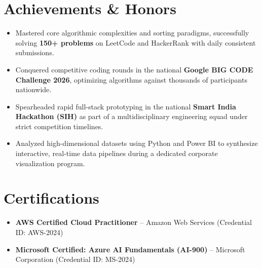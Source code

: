 \documentclass[letterpaper,11pt]{article}
\newcommand{\resumeItem}[1]{
  \item\small{
    {#1 \vspace{-2pt}}
  }
}
\newcommand{\resumeSubHeadingListStart}{\begin{itemize}[leftmargin=0.15in, label={}]}
\newcommand{\resumeSubHeadingListEnd}{\end{itemize}}
\begin{document}
\section{Achievements \& Honors}
 \resumeSubHeadingListStart
    \resumeItem{Mastered core algorithmic complexities and sorting paradigms, successfully solving \textbf{150+ problems} on LeetCode and HackerRank with daily consistent submissions.}
    \resumeItem{Conquered competitive coding rounds in the national \textbf{Google BIG CODE Challenge 2026}, optimizing algorithms against thousands of participants nationwide.}
    \resumeItem{Spearheaded rapid full-stack prototyping in the national \textbf{Smart India Hackathon (SIH)} as part of a multidisciplinary engineering squad under strict competition timelines.}
    \resumeItem{Analyzed high-dimensional datasets using Python and Power BI to synthesize interactive, real-time data pipelines during a dedicated corporate visualization program.}
 \resumeSubHeadingListEnd


\section{Certifications}
 \resumeSubHeadingListStart
    \resumeItem{\textbf{AWS Certified Cloud Practitioner} -- Amazon Web Services (Credential ID: AWS-2024)}
    \resumeItem{\textbf{Microsoft Certified: Azure AI Fundamentals (AI-900)} -- Microsoft Corporation (Credential ID: MS-2024)}
 \resumeSubHeadingListEnd

\end{document}
